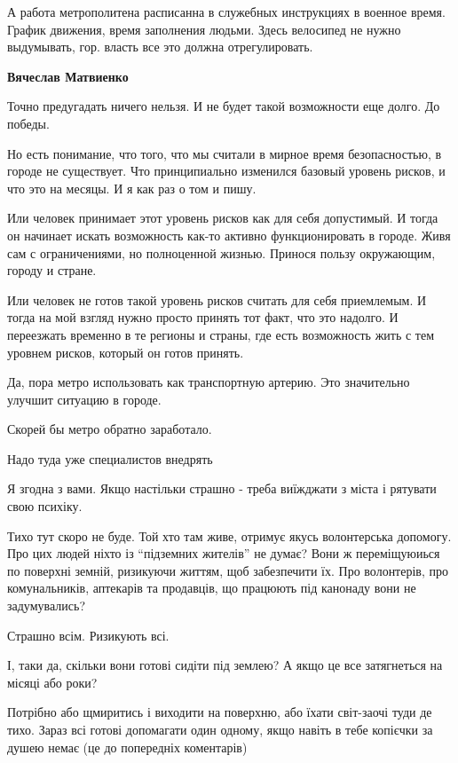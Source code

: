 \begin{itemize}
А работа метрополитена расписанна в служебных инструкциях в военное
время. График движения, время заполнения людьми. Здесь велосипед не нужно
выдумывать, гор. власть все это должна отрегулировать.

\begin{itemize} %
\textbf{Вячеслав Матвиенко} 

Точно предугадать ничего нельзя. И не будет такой возможности еще долго. До
победы.

Но есть понимание, что того, что мы считали в мирное время безопасностью, в
городе не существует. Что принципиально изменился базовый уровень рисков, и что
это на месяцы. И я как раз о том и пишу.

Или человек принимает этот уровень рисков как для себя допустимый. И тогда он
начинает искать возможность как-то активно функционировать в городе. Живя сам с
ограничениями, но полноценной жизнью. Принося пользу окружающим, городу и
стране.

Или человек не готов такой уровень рисков считать для себя приемлемым. И тогда
на мой взгляд нужно просто принять тот факт, что это надолго. И переезжать
временно в те регионы и страны, где есть возможность жить с тем уровнем рисков,
который он готов принять.

\end{itemize} %

Да, пора метро использовать как транспортную артерию. Это значительно улучшит ситуацию в городе.

Скорей бы метро обратно заработало.

Надо туда уже специалистов внедрять


Я згодна з вами. Якщо настільки страшно - треба виїжджати з міста і рятувати
свою психіку.

Тихо тут скоро не буде. Той хто там живе, отримує якусь волонтерська допомогу.
Про цих людей ніхто із \enquote{підземних жителів} не думає? Вони ж переміщуюиься по
поверхні земній, ризикуючи життям, щоб забезпечити їх. Про волонтерів, про
комунальників, аптекарів та продавців, що працюють під канонаду вони не
задумувались?

Страшно всім. Ризикують всі.

І, таки да, скільки вони готові сидіти під землею? А якщо це все затягнеться на місяці або роки?

Потрібно або щмиритись і виходити на поверхню, або їхати світ-заочі туди де
тихо. Зараз всі готові допомагати один одному, якщо навіть в тебе копієчки за
душею немає (це до попередніх коментарів)


\end{itemize}
